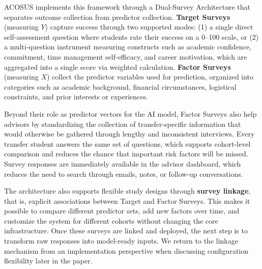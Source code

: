 \documentclass[letterpaper,11pt]{article}
\begin{document}
ACOSUS implements this framework through a Dual-Survey Architecture that separates outcome collection from predictor collection. \textbf{Target Surveys} (measuring $Y$) capture success through two supported modes: (1) a single direct self-assessment question where students rate their success on a 0--100 scale, or (2) a multi-question instrument measuring constructs such as academic confidence, commitment, time management self-efficacy, and career motivation, which are aggregated into a single score via weighted calculation. \textbf{Factor Surveys} (measuring $X$) collect the predictor variables used for prediction, organized into categories such as academic background, financial circumstances, logistical constraints, and prior interests or experiences.

Beyond their role as predictor vectors for the AI model, Factor Surveys also help advisors by standardizing the collection of transfer-specific information that would otherwise be gathered through lengthy and inconsistent interviews. Every transfer student answers the same set of questions, which supports cohort-level comparison and reduces the chance that important risk factors will be missed. Survey responses are immediately available in the advisor dashboard, which reduces the need to search through emails, notes, or follow-up conversations.

The architecture also supports flexible study designs through \textbf{survey linkage}, that is, explicit associations between Target and Factor Surveys. This makes it possible to compare different predictor sets, add new factors over time, and customize the system for different cohorts without changing the core infrastructure. Once these surveys are linked and deployed, the next step is to transform raw responses into model-ready inputs. We return to the linkage mechanism from an implementation perspective when discussing configuration flexibility later in the paper.
\end{document}
